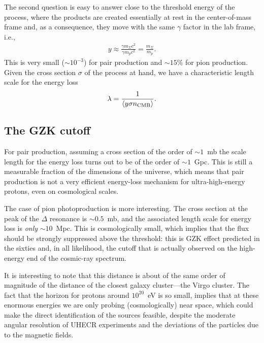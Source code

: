 The second question is easy to answer close to the threshold energy of the process,
where the products are created essentially at rest in the center-of-mass frame and,
as a consequence, they move with the same $\gamma$ factor in the lab frame, i.e.,
\begin{align}
  y \approx \frac{\gamma m_\Sigma c^2}{\gamma m_p c^2} = \frac{m_\Sigma}{m_p}.
\end{align}
This is very small ($\sim 10^{-3}$) for pair production and $\sim 15\%$ for pion
production. Given the cross section $\sigma$ of the process at hand, we have a
characteristic length scale for the energy loss
\begin{align}
  \lambda = \frac{1}{\left<y \sigma n_\text{CMB}\right>}.
\end{align}



\subsection{The GZK cutoff}

For pair production, assuming a cross section of the order of
$\sim 1$~mb the scale length for the energy loss turns out to be of the
order of $\sim 1$~Gpc. This is still a measurable fraction of the dimensions of the
universe, which means that pair production is not a very efficient energy-loss
mechanism for ultra-high-energy protons, even on cosmological scales.

The case of pion photoproduction is more interesting. The cross section at the
peak of the $\Delta$ resonance is $\sim 0.5$~mb, and the associated length scale
for energy loss is \emph{only} $\sim 10$~Mpc. This is cosmologically small,
which implies that the flux should be strongly suppressed above the threshold: this is
GZK effect predicted in the sixties and, in all likelihood, the cutoff that is
actually observed on the high-energy end of the cosmic-ray spectrum.

It is interesting to note that this distance is about of the same order of magnitude
of the distance of the closest galaxy cluster---the Virgo cluster. The fact that
the horizon for protons around $10^{20}$~eV is so small, implies that at these
enormous energies we are only probing (cosmologically) near space, which could make
the direct identification of the sources feasible, despite the moderate angular
resolution of UHECR experiments and the deviations of the particles due to the
magnetic fields.


